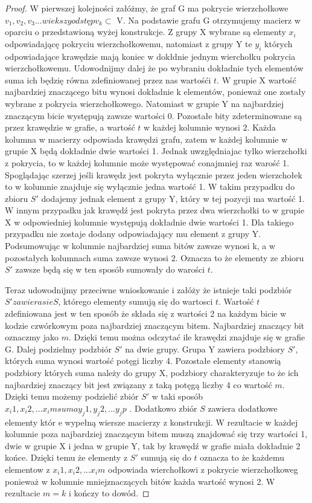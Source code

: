 \begin{proof}
W pierwszej kolejności załóżmy, że graf G ma pokrycie wierzchołkowe $ { v_1,v_2, v_3 ... wiekszy odstęp  v_k} \subset $ V. Na podstawie grafu G otrzymujemy macierz w oparciu o przedstawioną wyżej konstrukcje. Z grupy X wybrane są elementy $x_i$ odpowiadającę pokryciu wierzchołkowemu, natomiast z grupy Y te $y_i$ których odpowiadające krawędzie mają koniec w dokłdnie jednym wierchołku pokrycia wierzchołkowemu. Udowodnijmy dalej że po wybraniu dokładnie tych elementów suma ich będzię równa zdefiniowanej przez nas wartośći $t$. W grupie X wartość najbardziej znaczącego bitu wynosi dokładnie k elementów, ponieważ one zostały wybrane z pokrycia wierzchołkowego. Natomiast w grupie Y na najbardziej znaczącym bicie występują zawsze wartości 0. Pozostałe bity zdeterminowane są przez krawędzie w grafie, a wartość $t$ w każdej kolumnie wynosi $2$. Każda kolumna w macierzy odpowiada krawędzi grafu, zatem w każdej kolumnie w grupie X będą dokładnie dwie wartości 1. Jednak uwzględniajac tylko wierzchołki z pokrycia, to w każdej kolumnie może występować conajmniej raz warość 1. Spoglądając szerzej jeśli krawędz jest pokryta wyłącznie przez jeden wierzchołek to w kolumnie znajduje się wyłącznie jedna wartość 1. W takim przypadku do zbioru $S'$ dodajemy jednak element z grupy Y, który w tej pozycji ma wartość 1. W innym przypadku jak krawędź jest pokryta przez dwa wierzchołki to w grupie X w odpowiedniej kolumnie występują dokładnie dwie wartości 1. Dla takiego przypadku nie zostaje dodany odpowiadający mu element z grupy Y. Podsumowując w kolumnie najbardziej suma bitów zawsze wynosi k, a w pozostałych kolumnach suma zawsze wynosi 2. Oznacza to że elementy ze zbioru $S'$ zawsze będą się w ten sposób sumowały do warości $t$.

Teraz udowodnijmy przeciwne wnioskowanie i załóży że istnieje taki podzbiór $S' zawierasie S$, którego elementy sumują się do wartosci $t$.  Wartość $t$ zdefiniowana jest w ten sposób że składa się z wartości 2 na każdym bicie w kodzie czwórkowym poza najbardziej znaczącym bitem. Najbardziej znaczący bit oznaczmy jako $m$. Dzięki temu można odczytać ile krawędzi znajduje się w grafie G. Dalej podzielmy podzbiór $S'$ na dwie grupy. Grupa Y zawiera podzbiory $ S' $, których suma wynosi wartość potęgi liczby 4. Pozostałe elementy stanowią podzbiory których suma należy do grupy X, podzbiory charakteryzuje to że ich najbardziej znaczący bit jest związany z taką potęgą liczby 4 co wartość $m$. Dzięki temu możemy podzielić zbiór $ S' $ w taki sposób $ { x_i1, x_i2, ... x_im } suma { y_j1, y_j2, ... y_jp } $ . Dodatkowo zbiór $ S $ zawiera dodatkowe elementy któr
e wypełną wiersze macierzy z konstrukcji. W rezultacie w każdej kolumnie poza najbardziej znaczącym bitem muszą znajdować się trzy wartości 1, dwie w grupie X i jedna w grupie Y, tak by krawędź w grafie miała dokładnie 2 końce. Dzięki temu że elementy z $S'$ sumują się do $t$ oznacza to że każdemu elementow z $ {x_i1, x_i2, ... x_im}$ odpowiada wierchołkowi z pokrycie wierzchołkoweg ponieważ w kolumnie mniejznaczących bitów każda wartość wynosi 2. W rezultacie $m = k$ i kończy to dowód. 

\end{proof}


